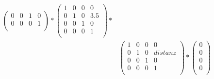 \documentclass[a4paper,11pt,DIV11]{scrartcl}
\begin{document}
\begin{align}
\begin{pmatrix}
0 & 0 & 1 & 0 \\
0 & 0 & 0 & 1 \\
\end{pmatrix}
*
\begin{pmatrix}
1 & 0 & 0 & 0 \\
0 & 1 & 0 & 3.5 \\
0 & 0 & 1 & 0 \\
0 & 0 & 0 & 1 \\
\end{pmatrix}
* \\ &
\begin{pmatrix}
1 & 0 & 0 & 0 \\
0 & 1 & 0 & distanz \\
0 & 0 & 1 & 0 \\
0 & 0 & 0 & 1 \\
\end{pmatrix}
*
\begin{pmatrix}
0 \\
0 \\
0 \\
0 \\
\end{pmatrix}
\end{align}
\end{document}
